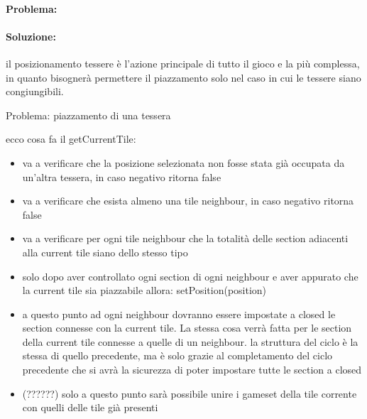 \paragraph{Problema:}
\paragraph{Soluzione:}

%
il posizionamento tessere è l'azione principale di tutto il gioco e la più complessa, in quanto bisognerà permettere il piazzamento solo nel caso in cui le tessere siano congiungibili.
%

Problema: piazzamento di una tessera


ecco cosa fa il getCurrentTile:

\begin{itemize}
\item va a verificare che la posizione selezionata non fosse stata già occupata da un’altra tessera, in caso negativo ritorna false
\item va a verificare che esista almeno una tile neighbour, in caso negativo ritorna false
\item va a verificare per ogni tile neighbour che la totalità delle section adiacenti alla current tile siano dello stesso tipo
\item solo dopo aver controllato ogni section di ogni neighbour e aver appurato che la current tile sia piazzabile allora: setPosition(position)
\item a questo punto ad ogni neighbour dovranno essere impostate a closed le section connesse con la current tile. La stessa cosa verrà fatta per le section della current tile connesse a quelle di un neighbour.
\subitem la struttura del ciclo è la stessa di quello precedente, ma è solo grazie al completamento del ciclo precedente che si avrà la sicurezza di poter impostare tutte le section a closed
\item (??????) solo a questo punto sarà possibile unire i gameset della tile corrente con quelli delle tile già presenti
\end{itemize}
